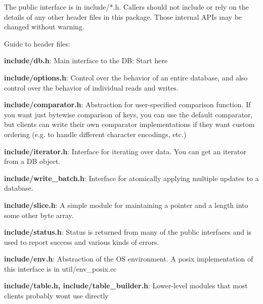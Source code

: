 The public interface is in include/$\ast$.h. Callers should not include or rely on the details of any other header files in this package. Those internal A\+P\+Is may be changed without warning.

Guide to header files\+:


\begin{DoxyItemize}
\item {\bfseries{include/db.\+h}}\+: Main interface to the DB\+: Start here
\item {\bfseries{include/options.\+h}}\+: Control over the behavior of an entire database, and also control over the behavior of individual reads and writes.
\item {\bfseries{include/comparator.\+h}}\+: Abstraction for user-\/specified comparison function. If you want just bytewise comparison of keys, you can use the default comparator, but clients can write their own comparator implementations if they want custom ordering (e.\+g. to handle different character encodings, etc.)
\item {\bfseries{include/iterator.\+h}}\+: Interface for iterating over data. You can get an iterator from a DB object.
\item {\bfseries{include/write\+\_\+batch.\+h}}\+: Interface for atomically applying multiple updates to a database.
\item {\bfseries{include/slice.\+h}}\+: A simple module for maintaining a pointer and a length into some other byte array.
\item {\bfseries{include/status.\+h}}\+: Status is returned from many of the public interfaces and is used to report success and various kinds of errors.
\item {\bfseries{include/env.\+h}}\+: Abstraction of the OS environment. A posix implementation of this interface is in util/env\+\_\+posix.\+cc
\item {\bfseries{include/table.\+h, include/table\+\_\+builder.\+h}}\+: Lower-\/level modules that most clients probably won\textquotesingle{}t use directly 
\end{DoxyItemize}